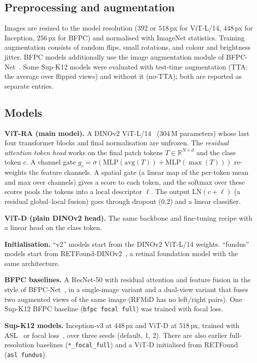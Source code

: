 ﻿\documentclass[conference]{IEEEtran}
\begin{document}
\subsection{Preprocessing and augmentation}
Images are resized to the model resolution ($392$ or $518$\,px for ViT-L/14, $448$\,px for Inception, $256$\,px for BFPC) and normalised with ImageNet statistics.
Training augmentation consists of random flips, small rotations, and colour and brightness jitter. BFPC models additionally use the image augmentation module of BFPC-Net~\cite{li2022bfpc}.
Some Sup-K12 models were evaluated with test-time augmentation (TTA: the average over flipped views) and without it (no-TTA); both are reported as separate entries.

\subsection{Models}
\textbf{ViT-RA (main model).}
A DINOv2 ViT-L/14~\cite{oquab2024dinov2,wightman2019timm} (304\,M parameters) whose last four transformer blocks and final normalisation are unfrozen.
The \emph{residual attention token head} works on the final patch tokens $T\in\mathbb{R}^{N\times d}$ and the class token $c$.
A channel gate $g_c=\sigma(\mathrm{MLP}(\mathrm{avg}(T))+\mathrm{MLP}(\max(T)))$ re-weights the feature channels.
A spatial gate (a linear map of the per-token mean and max over channels) gives a score to each token, and the softmax over these scores pools the tokens into a local descriptor $\ell$.
The output $\mathrm{LN}(c+\ell)$ (a residual global--local fusion) goes through dropout (0.2) and a linear classifier.

\textbf{ViT-D (plain DINOv2 head).} The same backbone and fine-tuning recipe with a linear head on the class token.

\textbf{Initialisation.} ``v2'' models start from the DINOv2 ViT-L/14 weights. ``fundus'' models start from RETFound-DINOv2~\cite{zhou2023retfound}, a retinal foundation model with the same architecture.

\textbf{BFPC baselines.} A ResNet-50 with residual attention and feature fusion in the style of BFPC-Net~\cite{li2022bfpc}, in a single-image variant and a dual-view variant that fuses two augmented views of the same image (RFMiD has no left/right pairs). One Sup-K12 BFPC baseline (\texttt{bfpc focal full}) was trained with focal loss.

\textbf{Sup-K12 models.} Inception-v3 at $448$\,px and ViT-D at $518$\,px, trained with ASL~\cite{ridnik2021asl} or focal loss~\cite{lin2017focal}, over three seeds (default, 1, 2). There are also earlier full-resolution baselines (\texttt{*\_focal\_full}) and a ViT-D initialised from RETFound (\texttt{asl fundus}).
\end{document}
